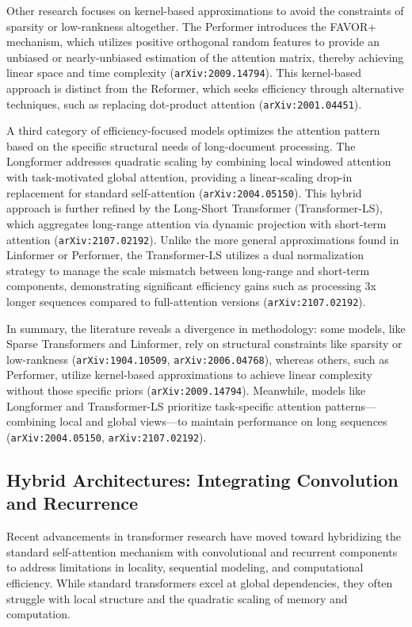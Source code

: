 \documentclass[11pt]{article}
\begin{document}
Other research focuses on kernel-based approximations to avoid the constraints of sparsity or low-rankness altogether. The Performer introduces the FAVOR+ mechanism, which utilizes positive orthogonal random features to provide an unbiased or nearly-unbiased estimation of the attention matrix, thereby achieving linear space and time complexity (\texttt{arXiv:2009.14794}). This kernel-based approach is distinct from the Reformer, which seeks efficiency through alternative techniques, such as replacing dot-product attention (\texttt{arXiv:2001.04451}).

A third category of efficiency-focused models optimizes the attention pattern based on the specific structural needs of long-document processing. The Longformer addresses quadratic scaling by combining local windowed attention with task-motivated global attention, providing a linear-scaling drop-in replacement for standard self-attention (\texttt{arXiv:2004.05150}). This hybrid approach is further refined by the Long-Short Transformer (Transformer-LS), which aggregates long-range attention via dynamic projection with short-term attention (\texttt{arXiv:2107.02192}). Unlike the more general approximations found in Linformer or Performer, the Transformer-LS utilizes a dual normalization strategy to manage the scale mismatch between long-range and short-term components, demonstrating significant efficiency gains such as processing 3x longer sequences compared to full-attention versions (\texttt{arXiv:2107.02192}).

In summary, the literature reveals a divergence in methodology: some models, like Sparse Transformers and Linformer, rely on structural constraints like sparsity or low-rankness (\texttt{arXiv:1904.10509}, \texttt{arXiv:2006.04768}), whereas others, such as Performer, utilize kernel-based approximations to achieve linear complexity without those specific priors (\texttt{arXiv:2009.14794}). Meanwhile, models like Longformer and Transformer-LS prioritize task-specific attention patterns—combining local and global views—to maintain performance on long sequences (\texttt{arXiv:2004.05150}, \texttt{arXiv:2107.02192}).

\subsection{Hybrid Architectures: Integrating Convolution and Recurrence}

Recent advancements in transformer research have moved toward hybridizing the standard self-attention mechanism with convolutional and recurrent components to address limitations in locality, sequential modeling, and computational efficiency. While standard transformers excel at global dependencies, they often struggle with local structure and the quadratic scaling of memory and computation.
\end{document}
